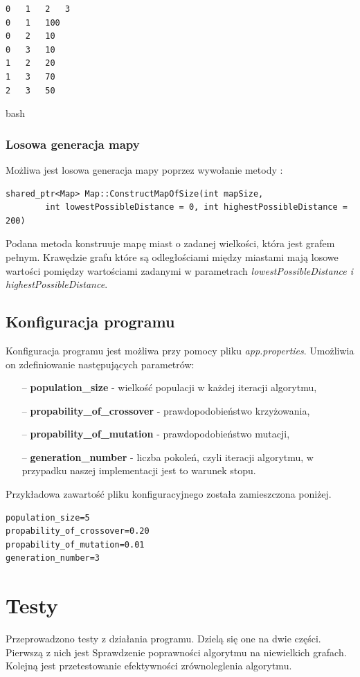 \documentclass[10pt,a4paper]{article}
\begin{document}
\begin{verbatim}
0	1	2	3
0	1	100
0	2	10
0	3	10
1	2	20
1	3	70
2	3	50
\end{verbatim}{bash}
\subsubsection{Losowa generacja mapy}

Możliwa jest losowa generacja mapy poprzez wywołanie metody :
\begin{verbatim}
shared_ptr<Map> Map::ConstructMapOfSize(int mapSize,
		int lowestPossibleDistance = 0, int highestPossibleDistance = 200)
\end{verbatim}
Podana metoda konstruuje mapę miast o zadanej wielkości, która jest grafem pełnym. Krawędzie grafu które są odległościami między miastami mają losowe wartości pomiędzy wartościami zadanymi w parametrach  \textit{lowestPossibleDistance i highestPossibleDistance}. 

\subsection{Konfiguracja programu}
Konfiguracja programu jest możliwa przy pomocy pliku \textit{app.properties}. Umożliwia on zdefiniowanie następujących parametrów:
\begin{itemize}
\item[--] \textbf{population\_size} - wielkość populacji w każdej iteracji algorytmu,
\item[--] \textbf{propability\_of\_crossover} - prawdopodobieństwo krzyżowania,
\item[--] \textbf{propability\_of\_mutation} - prawdopodobieństwo mutacji,
\item[--] \textbf{generation\_number} - liczba pokoleń, czyli iteracji algorytmu, w przypadku naszej implementacji jest to warunek stopu.
\end{itemize}

Przykładowa zawartość pliku konfiguracyjnego została zamieszczona poniżej.
\begin{verbatim}
population_size=5
propability_of_crossover=0.20
propability_of_mutation=0.01
generation_number=3
\end{verbatim}
\section{Testy}
Przeprowadzono testy z działania programu. Dzielą się one na dwie części. Pierwszą z nich jest Sprawdzenie poprawności algorytmu na niewielkich grafach. Kolejną jest przetestowanie efektywności zrównoleglenia algorytmu.
\end{document}
